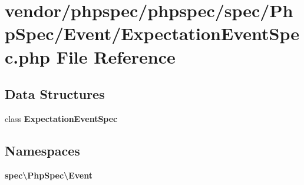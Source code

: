 \section{vendor/phpspec/phpspec/spec/\+Php\+Spec/\+Event/\+Expectation\+Event\+Spec.php File Reference}
\label{_expectation_event_spec_8php}
\subsection*{Data Structures}
\begin{DoxyCompactItemize}
\item 
class {\bf Expectation\+Event\+Spec}
\end{DoxyCompactItemize}
\subsection*{Namespaces}
\begin{DoxyCompactItemize}
\item 
 {\bf spec\textbackslash{}\+Php\+Spec\textbackslash{}\+Event}
\end{DoxyCompactItemize}
